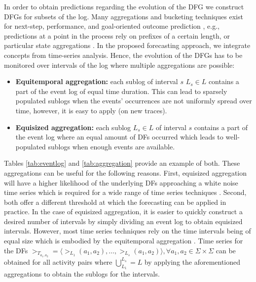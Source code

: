 In order to obtain predictions regarding the evolution of the DFG we construct DFGs for subsets of the log.
Many aggregations and bucketing techniques exist for next-step, performance, and goal-oriented outcome prediction \cite{DBLP:conf/caise/TaxVRD17,DBLP:journals/tkdd/TeinemaaDRM19,nguyen2016business}, e.g., predictions at a point in the process rely on prefixes of a certain length, or particular state aggregations \cite{DBLP:journals/sosym/AalstRVDKG10}.
In the proposed forecasting approach, we integrate concepts from time-series analysis.
Hence, the evolution of the DFGs has to be monitored over intervals of the log where multiple aggregations are possible:
\begin{itemize}
	\item \textbf{Equitemporal aggregation:} each sublog of interval $s$ $L_s\in L$ contains a part of the event log of equal time duration. This can lead to sparsely populated sublogs when the events' occurrences are not uniformly spread over time, however, it is easy to apply (on new traces).
	\item \textbf{Equisized aggregation:} each sublog $L_s\in L$ of interval $s$ contains a part of the event log where an equal amount of DFs occurred which leads to well-populated sublogs when enough events are available.
\end{itemize}
Tables \ref{tab:eventlog} and \ref{tab:aggregation} provide an example of both.
These aggregations can be useful for the following reasons.
First, equisized aggregation will have a higher likelihood of the underlying DFs approaching a white noise time series which is required for a wide range of time series techniques \cite{hyndman2018forecasting}. 
Second, both offer a different threshold at which the forecasting can be applied in practice.
In the case of equisized aggregation, it is easier to quickly construct a desired number of intervals by simply dividing an event log to obtain equisized intervals.
However, most time series techniques rely on the time intervals being of equal size which is embodied by the equitemporal aggregation \cite{kil1997optimum}.
Time series for the DFs $>_{T_{a_1,a_2}}=\langle >_{L_1}(a_1,a_2),\dots,>_{L_s}(a_1,a_2)\rangle, \forall a_1,a_2\in \Sigma\times\Sigma$ can be obtained for all activity pairs where $\bigcup^{L_s}_{L_1}=L$ by applying the aforementioned aggregations to obtain the sublogs for the intervals.
